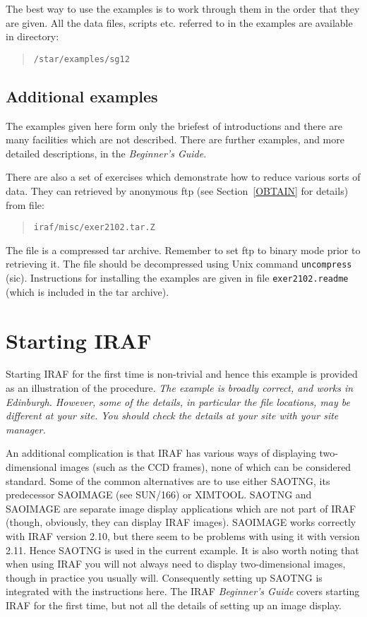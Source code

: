 \documentclass[twoside,11pt]{article}
\newcommand{\htmladdnormallink}[2]{#1}
\newcommand{\xref}[3]{#1}
\newcommand{\xlabel}[1]{}
\begin{document}
The best way to use the examples is to work through them in the order
that they are given.  All the data files, scripts etc. referred to in
the examples are available in directory:

\begin{quote}
{\tt /star/examples/sg12}
\end{quote}

\subsection{Additional examples}

The examples given here form only the briefest of introductions and
there are many facilities which are not described.  There are further
examples, and more detailed descriptions, in the {\it Beginner's
Guide}\/\cite{BARNES93}.

There are also a set of exercises which demonstrate how to reduce
various sorts of data.  They can retrieved by anonymous ftp (see
Section~\ref{OBTAIN} for details) from file:

\begin{quote}
{\tt iraf/misc/exer2102.tar.Z}
\end{quote}

The file is a compressed tar archive.  Remember to set ftp to binary
mode prior to retrieving it.  The file should be decompressed using Unix
command {\tt uncompress} (sic).  Instructions for installing the
examples are given in file
\htmladdnormallink{{\tt exer2102.readme}}
{ftp://iraf.noao.edu/iraf/misc/exer2102.readme}
(which is included in the tar archive).


\newpage
\section{\xlabel{START}\label{START}Starting IRAF}

Starting IRAF for the first time is non-trivial and hence this example
is provided as an illustration of the procedure.  {\it The example is
broadly correct, and works in Edinburgh.  However, some of the details,
in particular the file locations, may be different at your site.  You
should check the details at your site with your site manager.}

An additional complication is that IRAF has various ways of displaying
two-dimensional images (such as the CCD frames), none of which can be
considered standard.  Some of the common alternatives are to use either
SAOTNG, its predecessor SAOIMAGE (see \xref{SUN/166}{sun166}{}\cite{SUN166})
or XIMTOOL.  SAOTNG and SAOIMAGE are separate image display applications
which are not part of IRAF (though, obviously, they can display IRAF images).
SAOIMAGE works correctly with IRAF version 2.10, but there seem to be
problems with using it with version 2.11.  Hence SAOTNG is used
in the current example.  It is also worth noting that when using IRAF you
will not always need to display two-dimensional images, though in practice
you usually will.  Consequently setting up SAOTNG is integrated with the
instructions here.  The IRAF {\it Beginner's Guide}\/\cite{BARNES93} covers
starting IRAF for the first time, but not all the details of setting up an
image display.
\end{document}
